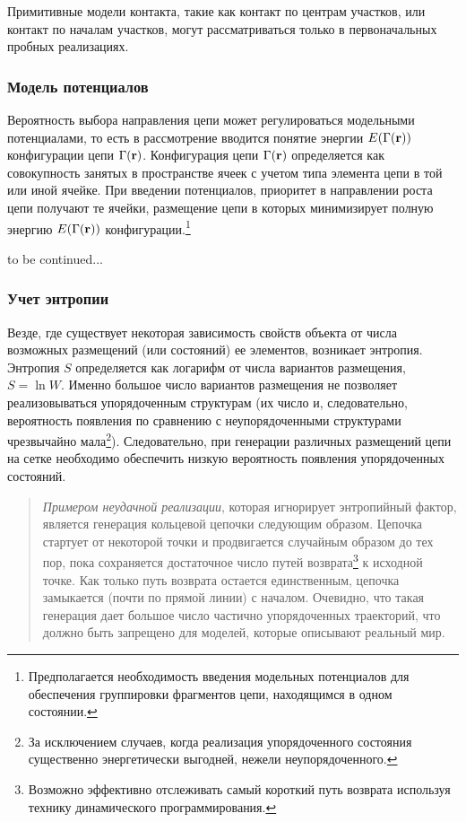 \documentclass[tikz,a4paper]{scrartcl} %
\begin{document}
Примитивные модели контакта, такие как контакт по центрам участков, или контакт по началам участков, могут рассматриваться только в первоначальных пробных реализациях. 

\subsubsection*{Модель потенциалов}
Вероятность выбора направления цепи может регулироваться модельными потенциалами, то есть в рассмотрение вводится понятие энергии $E(\Gamma(\bold r))$ конфигурации цепи $\Gamma(\bold r)$. Конфигурация цепи $\Gamma(\bold r)$ определяется как совокупность занятых в пространстве ячеек с учетом типа элемента цепи в той или иной ячейке. При введении потенциалов, приоритет в направлении роста цепи получают те ячейки, размещение цепи в которых минимизирует полную энергию $E(\Gamma(\bold r))$ конфигурации.\footnote{Предполагается необходимость введения модельных потенциалов для обеспечения группировки фрагментов цепи, находящимся в одном состоянии.} 

\begin{center} 
to be continued...
\end{center}

\subsubsection*{Учет энтропии}
Везде, где существует некоторая зависимость свойств объекта от числа возможных размещений (или состояний) ее элементов, возникает энтропия. Энтропия $S$ определяется как логарифм от числа вариантов размещения, $S = \ln W$. Именно большое число вариантов размещения не позволяет реализовываться упорядоченным структурам (их число и, следовательно, вероятность появления по сравнению с неупорядоченными структурами чрезвычайно мала\footnote{За исключением случаев, когда реализация упорядоченного состояния существенно энергетически выгодней, нежели неупорядоченного.}). Следовательно, при генерации различных размещений цепи на сетке необходимо обеспечить низкую вероятность появления упорядоченных состояний.

\begin{quote} \textit{Примером неудачной реализации}, которая игнорирует энтропийный фактор, является генерация кольцевой цепочки следующим образом. Цепочка стартует от некоторой точки и продвигается случайным образом до тех пор, пока сохраняется достаточное число путей возврата\footnote{Возможно эффективно отслеживать самый короткий путь возврата используя технику динамического программирования.} к исходной точке. Как только путь возврата остается единственным, цепочка замыкается (почти по прямой линии) с началом. Очевидно, что такая генерация дает большое число частично упорядоченных траекторий, что должно быть запрещено для моделей, которые описывают реальный мир.
\end{quote}
\end{document}
